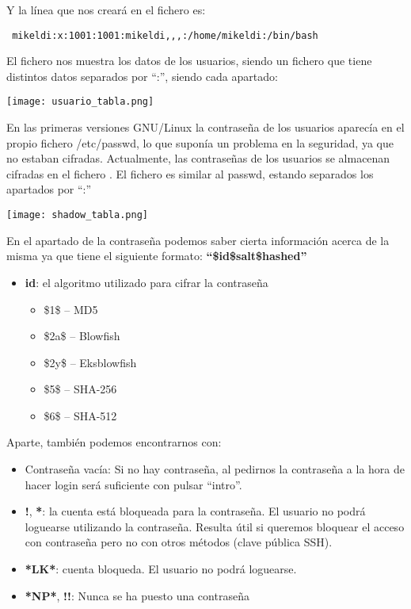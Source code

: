 Y la línea que nos creará en el fichero     es:
\begin{tcolorbox}[colback=white,title=Ejemplo de usaurio en “/etc/passwd”]
 \texttt{ mikeldi:x:1001:1001:mikeldi,,,:/home/mikeldi:/bin/bash }
\end{tcolorbox}

El fichero   nos muestra los datos de los usuarios, siendo un fichero que tiene distintos datos separados por “:”, siendo cada apartado:

\begin{center}
  \texttt{[image: usuario\_tabla.png]}
\end{center}


En las primeras versiones GNU/Linux la contraseña de los usuarios aparecía en el propio fichero /etc/passwd, lo que suponía un problema en la seguridad, ya que no estaban cifradas. Actualmente, las contraseñas de los usuarios se almacenan cifradas en el fichero . El fichero es similar al passwd, estando separados los apartados por “:”


\begin{center}
  \texttt{[image: shadow\_tabla.png]}
\end{center}


En el apartado de la contraseña podemos saber cierta información acerca de la misma ya que tiene el siguiente formato: \textbf{“\$id\$salt\$hashed”}
\begin{itemize}
    \item \textbf{id}: el algoritmo utilizado para cifrar la contraseña
    \begin{itemize}
        \item \$1\$ – MD5
        \item \$2a\$ – Blowfish
        \item \$2y\$ – Eksblowfish
        \item \$5\$ – SHA-256
        \item \$6\$ – SHA-512
    \end{itemize}
\end{itemize}

Aparte, también podemos encontrarnos con:
\begin{itemize}
    \item Contraseña vacía:  Si no hay contraseña, al pedirnos la contraseña a la hora de hacer login será suficiente con pulsar “intro”.
    \item \textbf{!}, \textbf{*}: la cuenta está bloqueada para la contraseña. El usuario no podrá loguearse utilizando la contraseña. Resulta útil si queremos bloquear el acceso con contraseña pero no con otros métodos (clave pública SSH).
    \item \textbf{*LK*}: cuenta bloqueda. El usuario no podrá loguearse.
    \item \textbf{*NP*}, \textbf{!!}: Nunca se ha puesto una contraseña
\end{itemize}



